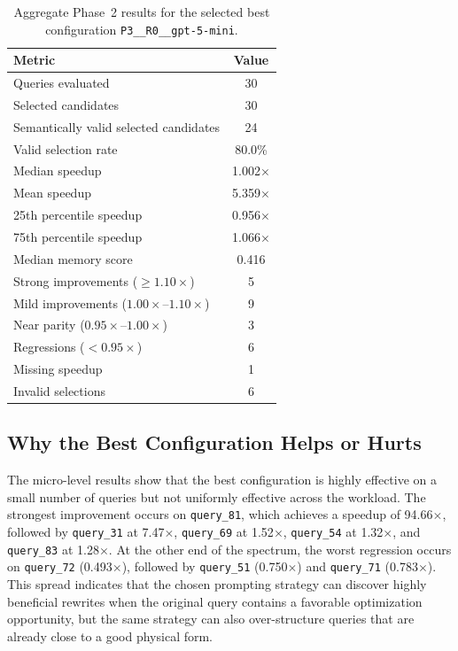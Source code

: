 \begin{table}[htbp]
\centering
\caption{Aggregate Phase~2 results for the selected best configuration \texttt{P3\_\_R0\_\_gpt-5-mini}.}
\label{tab:phase2-summary}
\begin{tabular}{|l|c|}
\textbf{Metric} & \textbf{Value} \\
\hline
Queries evaluated & 30 \\
Selected candidates & 30 \\
Semantically valid selected candidates & 24 \\
Valid selection rate & 80.0\% \\
Median speedup & 1.002$\times$ \\
Mean speedup & 5.359$\times$ \\
25th percentile speedup & 0.956$\times$ \\
75th percentile speedup & 1.066$\times$ \\
Median memory score & 0.416 \\
Strong improvements ($\geq 1.10\times$) & 5 \\
Mild improvements ($1.00\times$--$1.10\times$) & 9 \\
Near parity ($0.95\times$--$1.00\times$) & 3 \\
Regressions ($< 0.95\times$) & 6 \\
Missing speedup & 1 \\
Invalid selections & 6 \\
\hline
\end{tabular}
\end{table}

\subsection{Why the Best Configuration Helps or Hurts}

The micro-level results show that the best configuration is highly effective on a small number of queries but not uniformly effective across the workload. The strongest improvement occurs on \texttt{query\_81}, which achieves a speedup of 94.66$\times$, followed by \texttt{query\_31} at 7.47$\times$, \texttt{query\_69} at 1.52$\times$, \texttt{query\_54} at 1.32$\times$, and \texttt{query\_83} at 1.28$\times$. At the other end of the spectrum, the worst regression occurs on \texttt{query\_72} (0.493$\times$), followed by \texttt{query\_51} (0.750$\times$) and \texttt{query\_71} (0.783$\times$). This spread indicates that the chosen prompting strategy can discover highly beneficial rewrites when the original query contains a favorable optimization opportunity, but the same strategy can also over-structure queries that are already close to a good physical form.

